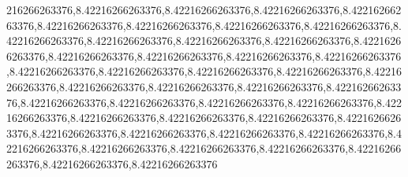 216266263376,8.42216266263376,8.42216266263376,8.42216266263376,8.42216266263376,8.42216266263376,8.42216266263376,8.42216266263376,8.42216266263376,8.42216266263376,8.42216266263376,8.42216266263376,8.42216266263376,8.42216266263376,8.42216266263376,8.42216266263376,8.42216266263376,8.42216266263376,8.42216266263376,8.42216266263376,8.42216266263376,8.42216266263376,8.42216266263376,8.42216266263376,8.42216266263376,8.42216266263376,8.42216266263376,8.42216266263376,8.42216266263376,8.42216266263376,8.42216266263376,8.42216266263376,8.42216266263376,8.42216266263376,8.42216266263376,8.42216266263376,8.42216266263376,8.42216266263376,8.42216266263376,8.42216266263376,8.42216266263376,8.42216266263376,8.42216266263376,8.42216266263376,8.42216266263376,8.42216266263376,8.42216266263376
